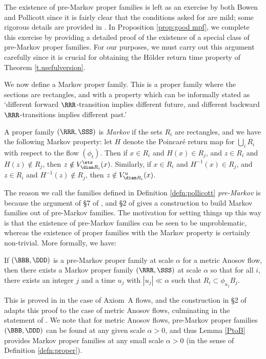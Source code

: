 The existence of pre-Markov proper families is left as an exercise by both Bowen and Pollicott since it is fairly clear that the conditions asked for are mild; some rigorous details are provided in \cite{BW}. In Proposition \ref{prop:good mpf}, we complete this exercise by providing a detailed proof of the existence of a special class of pre-Markov proper families. For our purposes, we must carry out this argument carefully since it is crucial for obtaining the Hölder return time property of Theorem \ref{t.usefulversion}.

We now define a Markov proper family. This is a proper family where the sections are rectangles, and with a property which can be informally stated as `different forward $\RRR$-transition implies different future, and different backward $\RRR$-transitions implies different past.'

\begin{defn}
A proper family $(\RRR, \SSS)$ is \emph{Markov} if the sets $R_i$ are rectangles, and we have the following Markov property: let $H$ denote the Poincaré return map for $\bigcup_i R_i$ with respect to the flow $(\phi_t)$. Then if $ x \in R_i$ and $ H(x) \in R_j$, and $z \in R_i$ and $H(z) \notin R_j$, then $z \notin V^{\sts}_{\diam R_i}(x)$. Similarly, if $ x \in R_i$ and $ H^{-1}(x) \in R_j$, and $z \in R_i$ and $H^{-1}(z) \notin R_j$, then $z \notin V^u_{\diam R_i}(x)$.
\end{defn}

The reason we call the families defined in Definition \ref{defn:pollicott} \emph{pre-Markov} is because the argument of \S7 of \cite{bowen-symbolic}, and \S2 of \cite{pollicott} gives a construction to build Markov families out of pre-Markov families. The motivation for setting things up this way is that the existence of pre-Markov families can be seen to be unproblematic, whereas the existence of proper families with the Markov property is certainly non-trivial. More formally, we have:

\begin{lem} \label{PtoB}
If $(\BBB, \DDD)$ is a pre-Markov proper family at scale $\alpha$ for a metric Anosov flow, then there exists a Markov proper family $(\RRR, \SSS)$ at scale $\alpha$ so that for all $i$, there exists an integer $j$ and a time $u_j$ with $|u_j|\ll \alpha$ such that $R_i \subset \phi_{u_j}B_j$.
\end{lem}

This is proved in \cite[\S7]{bowen-symbolic} in the case of Axiom~A flows, and the construction in \S2 of \cite{pollicott} adapts this proof to the case of metric Anosov flows, culminating in the statement of \cite[\S 2.2 `Key Lemma']{pollicott}. We note that for metric Anosov flows, pre-Markov proper families $(\BBB, \DDD)$ can be found at any given scale $\alpha>0$, and thus Lemma \ref{PtoB} provides Markov proper families at any small scale $\alpha>0$ (in the sense of Definition \ref{defn:proper}).

